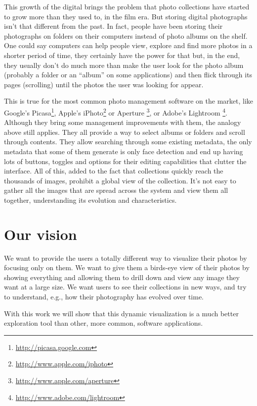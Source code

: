 This growth of the digital brings the problem that photo collections have started to grow more than they used to, in the film era. But storing digital photographs isn't that different from the past. In fact, people have been storing their photographs on folders on their computers instead of photo albums on the shelf. One could say computers can help people view, explore and find more photos in a shorter period of time, they certainly have the power for that but, in the end, they usually don't do much more than make the user look for the photo album (probably a folder or an ``album'' on some applications) and then flick through its pages (scrolling) until the photos the user was looking for appear.

This is true for the most common photo management software on the market, like Google's Picasa\footnote{\url{http://picasa.google.com}}, Apple's iPhoto\footnote{\url{http://www.apple.com/iphoto}} or Aperture \footnote{\url{http://www.apple.com/aperture}}, or Adobe's Lightroom \footnote{\url{http://www.adobe.com/lightroom}}. Although they bring some management improvements with them, the analogy above still applies. They all provide a way to select albums or folders and scroll through contents. They allow searching through some existing metadata, the only metadata that some of them generate is only face detection and end up having lots of buttons, toggles and options for their editing capabilities that clutter the interface. All of this, added to the fact that collections quickly reach the thousands of images, prohibit a global view of the collection. It's not easy to gather all the images that are spread across the system and view them all together, understanding its evolution and characteristics.

\section{Our vision} %
\label{ssub:our_vision}


We want to provide the users a totally different way to visualize their photos by focusing only on them. We want to give them a birds-eye view of their photos by showing everything and allowing them to drill down and view any image they want at a large size. We want users to see their collections in new ways, and try to understand, e.g., how their photography has evolved over time.

With this work we will show that this dynamic visualization is a much better exploration tool than other, more common, software applications.

